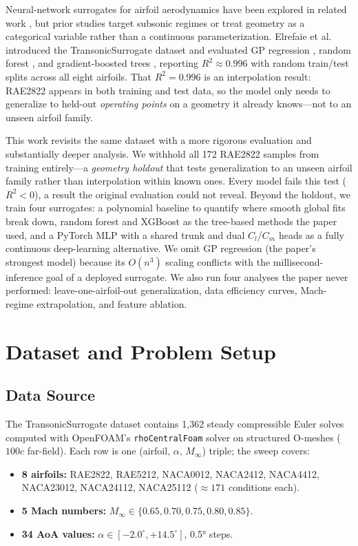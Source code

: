 \documentclass[11pt]{article}
\begin{document}
Neural-network surrogates for airfoil aerodynamics have been explored in
related work \cite{bouhlel2020}, but prior studies target subsonic regimes
or treat geometry as a categorical variable rather than a continuous
parameterization. Elrefaie et al.\ \cite{elrefaie2024} introduced the
TransonicSurrogate dataset and evaluated GP regression \cite{rasmussen2006},
random forest \cite{breiman2001}, and gradient-boosted trees \cite{chen2016},
reporting $R^2 \approx 0.996$ with random train/test splits across all eight
airfoils. That $R^2=0.996$ is an interpolation result: RAE2822 appears in
both training and test data, so the model only needs to generalize to
held-out \emph{operating points} on a geometry it already knows---not to
an unseen airfoil family.

This work revisits the same dataset with a more rigorous evaluation and
substantially deeper analysis. We withhold all 172 RAE2822 samples from
training entirely---a \emph{geometry holdout} that tests generalization to
an unseen airfoil family rather than interpolation within known ones. Every
model fails this test ($R^2 < 0$), a result the original evaluation could
not reveal. Beyond the holdout, we train four surrogates: a polynomial baseline
to quantify where smooth global fits break down, random forest and XGBoost
as the tree-based methods the paper used, and a PyTorch MLP \cite{paszke2019}
with a shared trunk and dual $C_l$/$C_m$ heads as a fully continuous
deep-learning alternative. We omit GP regression (the paper's strongest
model) because its $O(n^3)$ scaling conflicts with the millisecond-inference
goal of a deployed surrogate. We also run four analyses the paper never
performed: leave-one-airfoil-out generalization, data efficiency curves,
Mach-regime extrapolation, and feature ablation.

\section{Dataset and Problem Setup}

\subsection{Data Source}

The TransonicSurrogate dataset \cite{elrefaie2024} contains 1,362 steady
compressible Euler solves computed with OpenFOAM's \texttt{rhoCentralFoam}
solver on structured O-meshes ($100c$ far-field). Each row is one (airfoil,
$\alpha$, $M_\infty$) triple; the sweep covers:
\begin{itemize}[noitemsep,topsep=2pt]
  \item \textbf{8 airfoils:} RAE2822, RAE5212, NACA0012, NACA2412, NACA4412,
        NACA23012, NACA24112, NACA25112 ($\approx171$ conditions each).
  \item \textbf{5 Mach numbers:} $M_\infty \in \{0.65, 0.70, 0.75, 0.80, 0.85\}$.
  \item \textbf{34 AoA values:} $\alpha \in [-2.0^\circ, +14.5^\circ]$, 0.5° steps.
\end{itemize}
\end{document}
